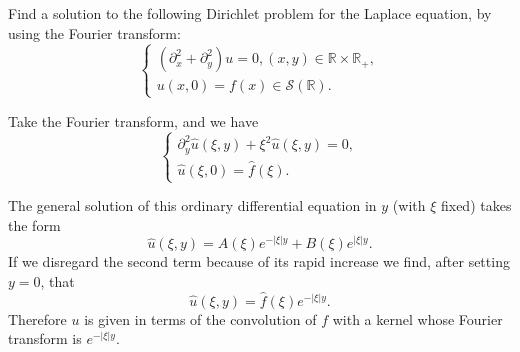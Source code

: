 \begin{pro}
  Find a solution to the following Dirichlet problem for
  the Laplace equation,
  by using the Fourier transform:
  \begin{displaymath}
    \begin{cases}
      (\partial_x^2 + \partial_y^2)u = 0, (x, y)\in\mathbb{R}
      \times\mathbb{R}_+, \\
      u(x, 0) = f(x) \in \mathcal{S}(\mathbb{R}).
    \end{cases}
  \end{displaymath}
\end{pro}

\begin{sol}
  Take the Fourier transform,
  and we have
  \begin{displaymath}
    \begin{cases}
      \partial_y^2\hat{u}(\xi, y) + \xi^2\hat{u}(\xi, y) = 0, \\
      \hat{u}(\xi, 0) = \hat{f}(\xi).
    \end{cases}
  \end{displaymath}

  The general solution of this ordinary differential equation
  in $y$ (with $\xi$ fixed) takes the form
  \begin{displaymath}
    \widehat{u}(\xi, y) = A(\xi)e^{-|\xi|y} + B(\xi)e^{|\xi|y}.
  \end{displaymath}
  If we disregard the second term because of
  its rapid increase we find, after setting $y=0$, that
  \begin{displaymath}
    \widehat{u}(\xi, y) = \widehat{f}(\xi)e^{-|\xi|y}.
  \end{displaymath}
  Therefore $u$ is given in terms of the convolution of $f$
  with a kernel whose Fourier transform is $e^{-|\xi|y}$.


\end{sol}
